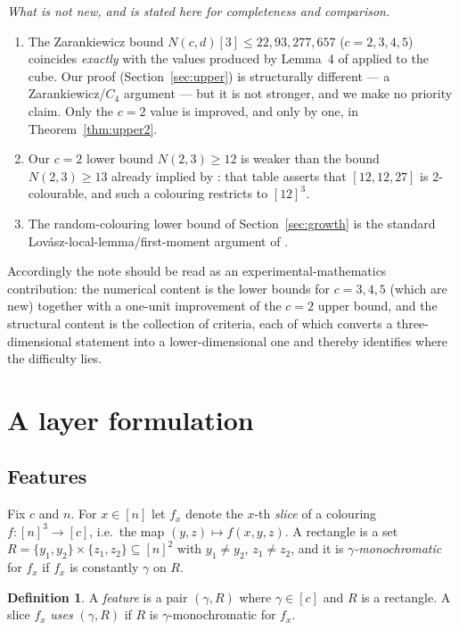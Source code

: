 \documentclass[11pt]{article}
\theoremstyle{definition}
\newtheorem{definition}[theorem]{Definition}
\newcommand{\Ncd}{N(c,d)}
\begin{document}
\emph{What is not new, and is stated here for completeness and comparison.}
\begin{enumerate}[label=(\roman*)]
\item The Zarankiewicz bound $\Ncd[3]\le 22,93,277,657$ ($c=2,3,4,5$) coincides
  \emph{exactly} with the values produced by Lemma~4 of \cite{CFP} applied to the cube.
  Our proof (Section~\ref{sec:upper}) is structurally different --- a Zarankiewicz/$C_4$
  argument --- but it is not stronger, and we make no priority claim. Only the $c=2$
  value is improved, and only by one, in Theorem~\ref{thm:upper2}.
\item Our $c=2$ lower bound $N(2,3)\ge 12$ is weaker than the bound $N(2,3)\ge13$ already
  implied by \cite[Fig.~3]{CFP}: that table asserts that $[12,12,27]$ is 2-colourable,
  and such a colouring restricts to $[12]^3$.
\item The random-colouring lower bound of Section~\ref{sec:growth} is the standard
  Lov\'asz-local-lemma/first-moment argument of \cite{CFP,ADS}.
\end{enumerate}
Accordingly the note should be read as an experimental-mathematics contribution: the
numerical content is the lower bounds for $c=3,4,5$ (which are new) together with a
one-unit improvement of the $c=2$ upper bound, and the structural content is the
collection of criteria, each of which converts a three-dimensional statement into a
lower-dimensional one and thereby identifies where the difficulty lies.

\section{A layer formulation}\label{sec:layer}

\subsection{Features}
Fix $c$ and $n$. For $x\in[n]$ let $f_x$ denote the $x$-th \emph{slice} of a colouring
$f\colon[n]^3\to[c]$, i.e.\ the map $(y,z)\mapsto f(x,y,z)$. A rectangle is a set
$R=\{y_1,y_2\}\times\{z_1,z_2\}\subseteq[n]^2$ with $y_1\neq y_2$, $z_1\neq z_2$, and it
is \emph{$\gamma$-monochromatic} for $f_x$ if $f_x$ is constantly $\gamma$ on $R$.

\begin{definition}
A \emph{feature} is a pair $(\gamma,R)$ where $\gamma\in[c]$ and $R$ is a rectangle.
A slice $f_x$ \emph{uses} $(\gamma,R)$ if $R$ is $\gamma$-monochromatic for $f_x$.
\end{definition}
\end{document}
